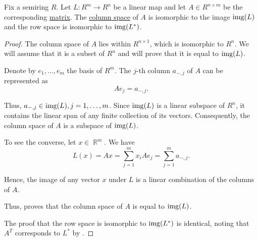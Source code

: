 \begin{proposition}\label{thm:column_and_row_spaces_are_images}
  Fix a semiring \( R \). Let \( L: R^m \to R^n \) be a linear map and let \( A \in R^{n \times m} \) be the corresponding \hyperref[thm:finite_dimensional_operators_are_isomorphic_to_matrices]{matrix}. The \hyperref[def:matrix_column_and_row_space]{column space} of \( A \) is isomorphic to the image \( \operatorname{img}(L) \) and the row space is isomorphic to \( \operatorname{img}(L^*) \).
\end{proposition}
\begin{proof}
  The column space of \( A \) lies within \( R^{n \times 1} \), which is isomorphic to \( R^n \). We will assume that it is a subset of \( R^n \) and will prove that it is equal to \( \operatorname{img}(L) \).

  Denote by \( e_1, \ldots, e_m \) the basis of \( R^m \). The \( j \)-th column \( a_{-,j} \) of \( A \) can be represented as
  \begin{equation*}
    A e_j = a_{-,j}.
  \end{equation*}

  Thus, \( a_{-,j} \in \operatorname{img}(L), j = 1, \ldots, m \). Since \( \operatorname{img}(L) \) is a linear subspace of \( R^n \), it contains the linear span of any finite collection of its vectors. Consequently, the column space of \( A \) is a subspace of \( \operatorname{img}(L) \).

  To see the converse, let \( x \in \BbbR^m \). We have
  \begin{equation*}
    L(x) = Ax = \sum_{j=1}^m x_i A e_j = \sum_{j=1}^m a_{-,j}.
  \end{equation*}

  Hence, the image of any vector \( x \) under \( L \) is a linear combination of the columns of \( A \).

  Thus, proves that the column space of \( A \) is equal to \( \operatorname{img}(L) \).

  The proof that the row space is isomorphic to \( \operatorname{img}(L^*) \) is identical, noting that \( A^T \) corresponds to \( L^* \) by .
\end{proof}
